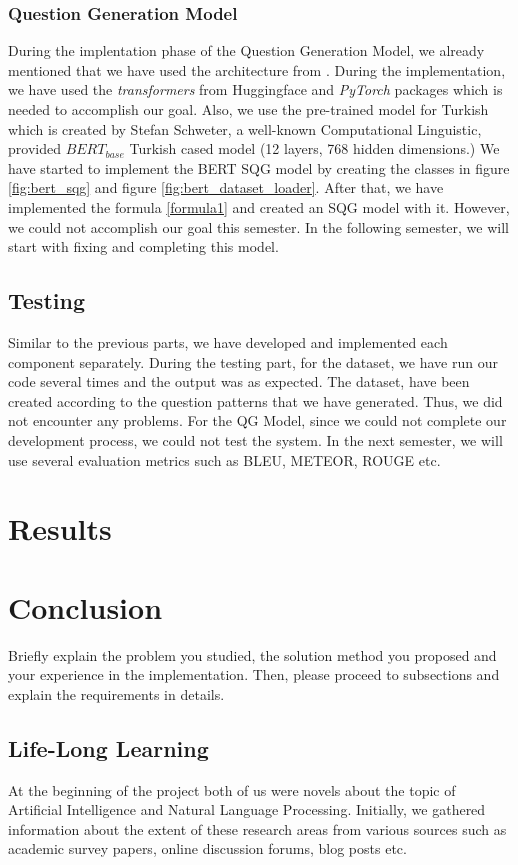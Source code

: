 \documentclass{mefsdp}
\begin{document}
	\subsubsection{Question Generation Model}
	During the implentation phase of the Question Generation Model, we already mentioned that we have used the architecture from \cite{chan-fan-2019-recurrent}. During the implementation, we have used the \textit{transformers} from Huggingface and \textit{PyTorch} packages which is needed to accomplish our goal. Also, we use the pre-trained model for Turkish which is created by Stefan Schweter, a well-known Computational Linguistic, provided $BERT_{base}$ Turkish cased model (12 layers, 768 hidden dimensions.) We have started to implement the BERT SQG model by creating the classes in figure \ref{fig:bert_sqg} and figure \ref{fig:bert_dataset_loader}. After that, we have implemented the formula \ref{formula1} and created an SQG model with it. However, we could not accomplish our goal this semester. In the following semester, we will start with fixing and completing this model.
	
	\subsection{Testing}
	Similar to the previous parts, we have developed and implemented each component separately. During the testing part, for the dataset, we have run our code several times and the output was as expected. The dataset, have been created according to the question patterns that we have generated. Thus, we did not encounter any problems. For the QG Model, since we could not complete our development process, we could not test the system. In the next semester, we will use several evaluation metrics such as BLEU, METEOR, ROUGE etc.
	
	\section{Results}
	
	
	\section{Conclusion}
	Briefly explain the problem you studied, the solution method you proposed and your experience in the implementation. Then, please proceed to subsections and explain the requirements in details. 
	
	\subsection{Life-Long Learning}
	At the beginning of the project both of us were novels about the topic of Artificial Intelligence and Natural Language Processing. Initially, we gathered information about the extent of these research areas from various sources such as academic survey papers, online discussion forums, blog posts etc. \newline \par
	
\end{document}
